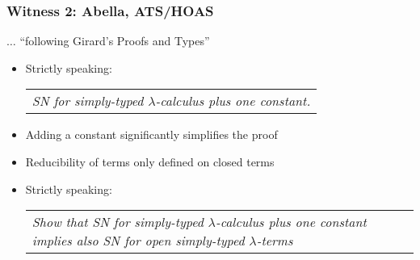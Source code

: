 \begin{frame}\frametitle{Witness 2: Abella, ATS/HOAS}\relax%
$\ldots$ ``following Girard's Proofs and Types''
\pause

\begin{itemize}
%
\item Strictly speaking:%
\begin{center}
\begin{tabular}{p{10cm}}
\emph{SN for simply-typed $\lambda$-calculus plus one constant.}
\end{tabular}
\end{center}

\item Adding a constant significantly simplifies the proof
\item Reducibility of terms only defined on closed terms
\\[1ex]
\item Strictly speaking:
\begin{center}
\begin{tabular}{p{10cm}}
\emph{Show that SN for simply-typed $\lambda$-calculus plus one
  constant implies also SN for open simply-typed $\lambda$-terms}
\end{tabular}
\end{center}
\end{itemize}

\end{frame}


